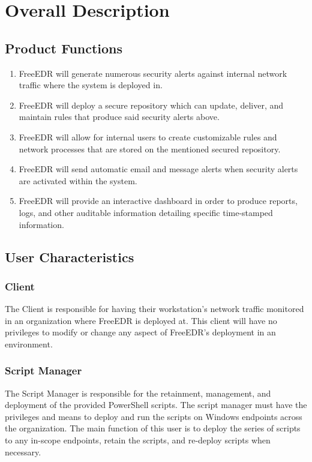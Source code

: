 \documentclass{scrreprt}
\begin{document}
\chapter{Overall Description}

\section{Product Functions}

\begin{enumerate}
\item FreeEDR will generate numerous security alerts against internal network traffic where the system is deployed in.
\item FreeEDR will deploy a secure repository which can update, deliver, and maintain rules that produce said security alerts above. 
\item FreeEDR will allow for internal users to create customizable rules and network processes that are stored on the mentioned secured repository. 
\item FreeEDR will send automatic email and message alerts when security alerts are activated within the system.
\item FreeEDR will provide an interactive dashboard in order to produce reports, logs, and other auditable information detailing specific time-stamped information.

\end{enumerate}

\section{User Characteristics}

\subsection{Client}
The Client is responsible for having their workstation’s network traffic monitored in an organization where FreeEDR is deployed at. This client will have no privileges to modify or change any aspect of FreeEDR’s deployment in an environment. 

\subsection{Script Manager}
The Script Manager is responsible for the retainment, management, and deployment of the provided PowerShell scripts. The script manager must have the privileges and means to deploy and run the scripts on Windows endpoints across the organization. The main function of this user is to deploy the series of scripts to any in-scope endpoints, retain the scripts, and re-deploy scripts when necessary.
\end{document}
